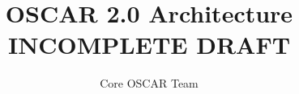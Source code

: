 %
%
%

\title{OSCAR 2.0 Architecture \\
INCOMPLETE DRAFT}
\author{Core OSCAR Team}
\maketitle
\newpage
